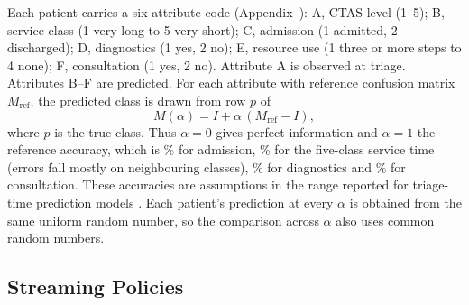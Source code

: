 Each patient carries a six-attribute code (Appendix~): A, CTAS level (1--5); B, service class (1 very long to 5 very short); C, admission (1 admitted, 2 discharged); D, diagnostics (1 yes, 2 no); E, resource use (1 three or more steps to 4 none); F, consultation (1 yes, 2 no). Attribute A is observed at triage. Attributes B--F are predicted. For each attribute with reference confusion matrix $M_{\text{ref}}$, the predicted class is drawn from row $p$ of
\begin{equation}
M(\alpha) = I + \alpha\,(M_{\text{ref}} - I),
\label{eq:alpha}
\end{equation}
where $p$ is the true class. Thus $\alpha=0$ gives perfect information and $\alpha=1$ the reference accuracy, which is \AccAdm\% for admission, \AccSvc\% for the five-class service time (errors fall mostly on neighbouring classes), \AccDiag\% for diagnostics and \AccCons\% for consultation. These accuracies are assumptions in the range reported for triage-time prediction models \cite{Hong2018_disposition,SUN2011_disposition}. Each patient's prediction at every $\alpha$ is obtained from the same uniform random number, so the comparison across $\alpha$ also uses common random numbers.

\subsection{Streaming Policies}

